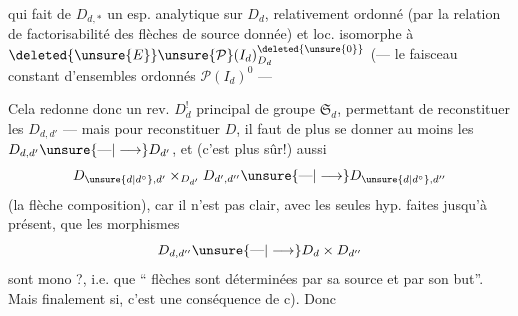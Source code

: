 qui fait de $D_{d,*}$ un esp. analytique sur $D_d$,  relativement ordonné (par la relation de factorisabilité
\diagram{\begin{tikzcd}[ampersand replacement=\&, column sep=small,row sep=small]
{} \& {} \arrow[dd,dotted] \\
\bullet \arrow[ru] \arrow[rd] \& \\
{} \& {}
\end{tikzcd}}
des flèches de source donnée) et loc. isomorphe à $\deleted{\unsure{E}}\unsure{\mathcal P}(I_d)^{\deleted{\unsure{0}}}_{D_d}$  (--- le faisceau constant d'ensembles ordonnés  $\mathcal P(I_d)^0$ ---

Cela redonne donc un rev. $D^!_d$ principal de groupe $\mathfrak S_d$, permettant de reconstituer les $D_{d,d'}$ --- mais pour reconstituer $D$, il faut de plus se donner  au moins les $D_{d,d'}\unsure{\text{---}|\longrightarrow}D_{d'}$, et (c'est plus sûr!) aussi
\[
D_{\unsure{d|d^\circ},d'}\mathbin{\times}_{D_{d'}}D_{d',d''}\unsure{\text{---}|\longrightarrow}D_{\unsure{d|d^\circ},d''}
\]
(la flèche composition), car il n'est pas clair, avec les seules hyp. faites jusqu'à présent, que les morphismes
\[
D_{d,d''}\unsure{\text{---}|\longrightarrow}D_d\times D_{d''}
\]
sont mono ?, i.e. que `` flèches sont déterminées par sa source et par son but''. Mais finalement si, c'est une conséquence de c). Donc
